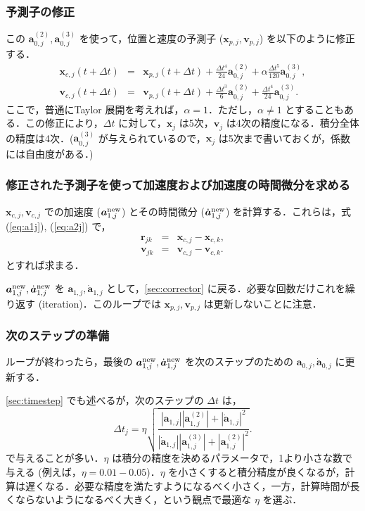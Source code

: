 \documentclass[11pt,a4paper,oneside,onecolumn]{jreport}
\begin{document}
\subsubsection{予測子の修正}
この ${\bm a}_{0,j}^{(2)}, {\bm a}_{0,j}^{(3)}$ を使って，位置と速度の予測子 (${\bm x}_{p,j}, {\bm v}_{p,j}$) を以下のように修正する．
\begin{eqnarray}
{\bm x}_{c,j} (t + \Delta t) & = & {\bm x}_{p,j} (t + \Delta t) +  \frac{\Delta t ^4}{24} {\bm a}_{0,j}^{(2)} + \alpha \frac{\Delta t ^5}{120} {\bm a}_{0,j}^{(3)}, \\
{\bm v}_{c,j} (t + \Delta t) & = & {\bm v}_{p,j} (t +\Delta t) + \frac{\Delta t ^3}{6} {\bm a}_{0,j}^{(2)} + \frac{\Delta t ^4}{24} {\bm a}_{0,j}^{(3)}. 
\end{eqnarray}
ここで，普通にTaylor 展開を考えれば，$\alpha = 1$．ただし，$\alpha \not= 1$ とすることもある．この修正により，$\Delta t$ に対して，${\bm x}_j$ は5次，${\bm v}_j$ は4次の精度になる．積分全体の精度は4次．(${\bm a}_{0,j}^{(3)}$ が与えられているので，${\bm x}_j$ は5次まで書いておくが，係数には自由度がある．)

\subsubsection{修正された予測子を使って加速度および加速度の時間微分を求める}
${\bm x}_{c,j}, {\bm v}_{c,j}$ での加速度 (${\bm a}_{1,j}^{\rm new}$) とその時間微分 ($\dot{{\bm a}}_{1,j}^{\rm new}$) を計算する．これらは，式 (\ref{eq:a1j}), (\ref{eq:a2j}) で，
\begin{eqnarray}
{\bm r}_{jk} & = & {\bm x}_{c,j} - {\bm x}_{c,k}, \\
{\bm v}_{jk} & = & {\bm v}_{c,j} - {\bm v}_{c,k}. 
\end{eqnarray}
とすれば求まる．

${\bm a}_{1,j}^{\rm new}, \dot{{\bm a}}_{1,j}^{\rm new}$ を ${\bm a}_{1,j}, \dot{{\bm a}}_{1,j}$ として，\ref{sec:corrector} に戻る．必要な回数だけこれを繰り返す (iteration)．このループでは ${\bm x}_{p,j}, {\bm v}_{p,j}$ は更新しないことに注意．

\subsubsection{次のステップの準備}
ループが終わったら，最後の ${\bm a}_{1,j}^{\rm new}, \dot{{\bm a}}_{1,j}^{\rm new}$ を次のステップのための ${\bm a}_{0,j}, \dot{{\bm a}}_{0,j}$ に更新する．

\ref{sec:timestep} でも述べるが，次のステップの $\Delta t$ は，
\begin{equation}
\Delta t_j = \eta \sqrt{\frac{| {\bm a}_{1,j} | | {\bm a}_{1,j}^{(2)} | + | \dot{{\bm a}}_{1,j} | ^2}{| \dot{{\bm a}}_{1,j} | | {\bm a}_{1,j}^{(3)} | + | {\bm a}_{1,j}^{(2)} | ^2}}.
\end{equation}
で与えることが多い．$\eta$ は積分の精度を決めるパラメータで，1より小さな数で与える (例えば，$\eta = 0.01 - 0.05$)．$\eta$ を小さくすると積分精度が良くなるが，計算は遅くなる．必要な精度を満たすようになるべく小さく，一方，計算時間が長くならないようになるべく大きく，という観点で最適な $\eta$ を選ぶ．
\end{document}
